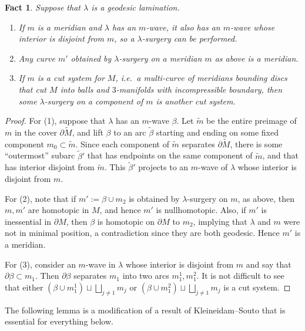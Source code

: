 \documentclass[12pt]{amsart}
\newtheorem{fact}[theorem]{Fact}
\theoremstyle{definition}
\theoremstyle{remark}
\begin{document}
\begin{fact}  \label{easy facts} Suppose that $\lambda $  is a geodesic lamination.
	\begin{enumerate}
		\item If $m$ is a meridian and $\lambda $ has an $m$-wave, it also has an $m$-wave whose interior is disjoint from $m$,  so a $\lambda $-surgery can be performed.
\item Any curve $m'$ obtained by $\lambda$-surgery on a meridian $m$ as above is a meridian.
\item If $m$ is a \emph{cut  system} for $M$, i.e.\ a multi-curve of meridians  bounding discs that cut $M$  into balls and $3$-manifolds with incompressible boundary, then some $\lambda $-surgery on a component of $m$ is another cut system. 
	\end{enumerate}
\end{fact}
\begin {proof}
	For (1),  suppose that $\lambda$ has an $m$-wave $\beta$. Let $\tilde m$ be the entire preimage of $m$  in the cover $\partial \tilde M$, and lift $\beta$  to an arc $\tilde \beta$  starting and ending on some fixed component $m_0 \subset \tilde m$.  Since each component of $\tilde m$ separates $ \partial \tilde M$,  there is some ``outermost'' subarc $\tilde \beta '$ that has endpoints on the same component of $\tilde m$, and that has interior disjoint from $\tilde m$. This $\tilde \beta '$  projects to an $m$-wave of $\lambda$  whose interior is disjoint from $m$.

For (2), note that if $m':=\beta \cup m_2$  is obtained by $\lambda$-surgery on $m$, as above, then $m,m'$ are homotopic in $M$, and hence $m'$ is nullhomotopic. Also, if $m'$ is inessential in $\partial M$, then $\beta$ is homotopic on $\partial M$ to $m_2$, implying that $\lambda$ and $m$ were not in minimal position, a contradiction since they are both geodesic. Hence $m'$ is a meridian.

For (3), consider an $m$-wave in $\lambda$ whose interior is disjoint from $m$ and say that $\partial\beta\subset m_1$. Then $\partial\beta$ separates $m_1$ into two arcs $m_1^1,m_1^2$. It is not difficult to see that either $(\beta \cup m_1^1) \sqcup \bigsqcup_{j\neq 1} m_j$ or $(\beta \cup m_1^2) \sqcup \bigsqcup_{j\neq 1} m_j$ is a cut system.
\end {proof}


The  following lemma is a  modification of  a result of Kleineidam--Souto \cite[Lemmas 7 and 8]{Kleineidamalgebraic}  that is essential  for everything below.
\end{document}

